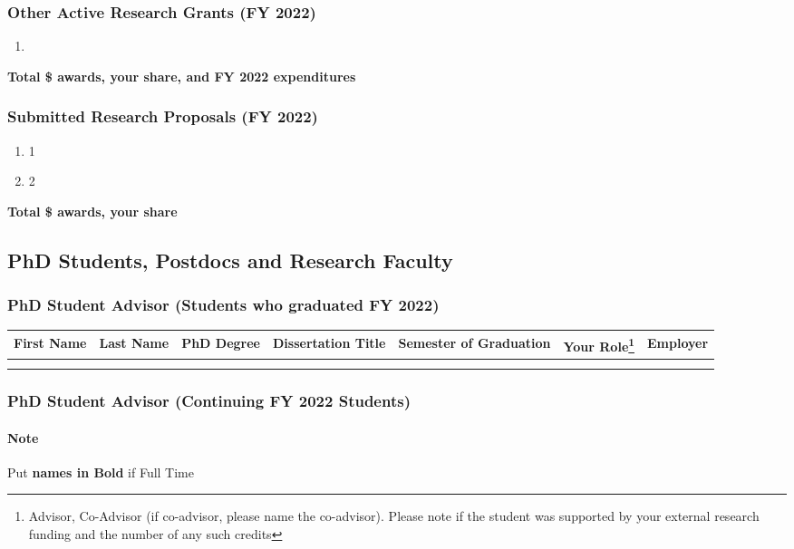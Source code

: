 \documentclass[11pt]{article}
\newcommand{\fy}{2022}
\newcommand{\mygrant}[1]{\item~\label{#1} \fullcite{\detokenize{#1}}}
\begin{document}
\subsubsection{Other Active Research Grants  (FY \fy{})}
\begin{enumerate}
  \mygrant{nsf2020kbuild}
\end{enumerate}
\textbf{Total \$ awards, your share, and FY \fy{} expenditures}


\subsubsection{Submitted Research Proposals (FY \fy{})}
\begin{enumerate}
\item 1
\item 2
\end{enumerate}
\textbf{Total \$ awards, your share}


\subsection{PhD Students, Postdocs and Research Faculty}


\subsubsection{PhD Student Advisor (Students who graduated FY \fy{})}

\begin{minipage}{\textwidth}
  \footnotesize
  \centering
  \begin{tabular}{ccccccc}
    \toprule
    First Name& Last Name& PhD Degree& Dissertation Title& Semester of Graduation& Your Role\footnote{Advisor, Co-Advisor (if co-advisor, please name the co-advisor). Please note if the student was supported by your external research
funding and the number of any such credits}& Employer\\
    \midrule
              &&&&&\\
              &&&&&
  \end{tabular}
\end{minipage}


\subsubsection{PhD Student Advisor (Continuing FY \fy{} Students)}

\paragraph{Note} Put \textbf{names in Bold} if Full Time
\end{document}
